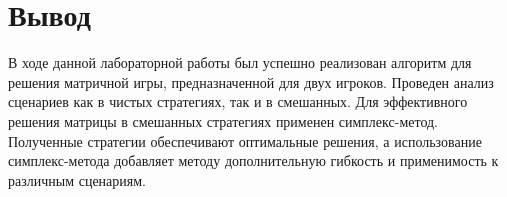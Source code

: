 \documentclass{article}
\begin{document}
\section{Вывод}

В ходе данной лабораторной работы был успешно реализован алгоритм для решения матричной игры, предназначенной для двух игроков. Проведен анализ сценариев как в чистых стратегиях, так и в смешанных. Для эффективного решения матрицы в смешанных стратегиях применен симплекс-метод. Полученные стратегии обеспечивают оптимальные решения, а использование симплекс-метода добавляет методу дополнительную гибкость и применимость к различным сценариям.
\end{document}
